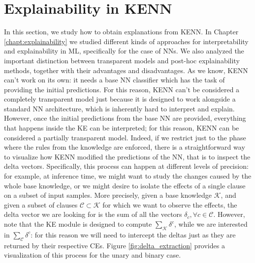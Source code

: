  \section{Explainability in KENN}
 \label{sec:explainability_kenn}
 In this section, we study how to obtain explanations from KENN. In Chapter \ref{chapt:explainability} we studied different kinds of approaches for interpretability and explainability in ML, specifically for the case of NNs. We also analyzed the important distinction between transparent models and post-hoc explainability methods, together with their advantages and disadvantages.
 As we know, KENN can't work on its own: it needs a base NN classifier which has the task of providing the initial predictions. For this reason, KENN can't be considered a completely transparent model just because it is designed to work alongside a standard NN architecture, which is inherently hard to interpret and explain. However, once the initial predictions from the base NN are provided, everything that happens inside the KE can be interpreted; for this reason, KENN can be considered a partially transparent model. Indeed, if we restrict just to the phase where the rules from the knowledge are enforced, there is a straightforward way to visualize how KENN modified the predictions of the NN, that is to inspect the delta vectors. Specifically, this process can happen at different levels of precision: for example, at inference time, we might want to study the changes caused by the whole base knowledge, or we might desire to isolate the effects of a single clause on a subset of input samples. More precisely, given a base knowledge $\mathcal{K}$, and given a subset of clauses $\mathcal{C} \subset \mathcal{K}$ for which we want to observe the effects, the delta vector we are looking for is the sum of all the vectors $\delta_c, \forall c \in \mathcal{C}$. However, note that the KE module is designed to compute $\sum_{\mathcal{K}}\delta^c$, while we are interested in $\sum_{\mathcal{C}}\delta^c$: for this reason we will need to intercept the deltas just as they are returned by their respective CEs. Figure \ref{fig:delta_extraction} provides a visualization of this process for the unary and binary case. 
